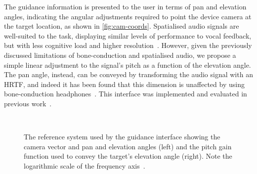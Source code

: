 \documentclass[acmsmall]{acmart}
\begin{document}
The guidance information is presented to the user in terms of pan and elevation angles, indicating the angular adjustments required to point the device camera at the target location, as shown in \cref{fig:cam-coords}.
Spatialised audio signals are well-suited to the task, displaying similar levels of performance to vocal feedback, but with less cognitive load and higher resolution~\citep{klatzky2006cognitive}.
However, given the previously discussed limitations of bone-conduction and spatialised audio, we propose a simple linear adjustment to the signal's pitch as a function of the elevation angle. 
The pan angle, instead, can be conveyed by transforming the audio signal with an HRTF, and indeed it has been found that this dimension is unaffected by using bone-conduction headphones~\citep{schonstein2008comparison,macdonald2006spatial,stanley2006lateralization,lock2019bone}. 
This interface was implemented and evaluated in previous work~\citep{lock2019bone}.

\begin{figure}
  \centering
~
  \caption{The reference system used by the guidance interface showing the camera vector and pan and elevation angles (left) and the pitch gain function used to convey the target's elevation angle (right). Note the logarithmic scale of the frequency axis~\citep{lock2019bone}. }
\end{figure}
\end{document}

